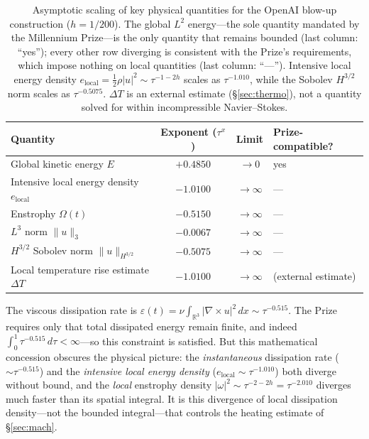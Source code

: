 \documentclass[11pt,a4paper]{article}
\begin{document}
\begin{table}[ht]
\centering
\begin{tabular}{lccl}
\toprule
\textbf{Quantity} & \textbf{Exponent} ($\tau^x$) & \textbf{Limit} & \textbf{Prize-compatible?} \\
\midrule
Global kinetic energy $E$                  & $+0.4850$   & $\to 0$        & yes \\
Intensive local energy density $e_{\text{local}}$ & $-1.0100$   & $\to \infty$   & --- \\
Enstrophy $\Omega(t)$                      & $-0.5150$   & $\to \infty$   & --- \\
$L^3$ norm $\|u\|_3$                        & $-0.0067$   & $\to \infty$   & --- \\
$H^{3/2}$ Sobolev norm $\|u\|_{H^{3/2}}$    & $-0.5075$   & $\to \infty$   & --- \\
Local temperature rise estimate $\Delta T$ & $-1.0100$   & $\to \infty$   & (external estimate) \\
\bottomrule
\end{tabular}
\caption{Asymptotic scaling of key physical quantities for the OpenAI blow-up construction
($h = 1/200$). The global $L^2$ energy---the sole quantity mandated by the Millennium Prize---is
the only quantity that remains bounded (last column: ``yes''); every other row diverging is
consistent with the Prize's requirements, which impose nothing on local quantities (last column:
``---''). Intensive local energy density $e_{\text{local}} = \frac{1}{2}\rho|u|^2 \sim \tau^{-1-2h}$ scales as $\tau^{-1.010}$, while the Sobolev $H^{3/2}$ norm scales as $\tau^{-0.5075}$. $\Delta T$ is an external estimate (\S\ref{sec:thermo}), not a quantity solved for within incompressible Navier--Stokes.}
\label{tab:thermo}
\end{table}

The viscous dissipation rate is $\varepsilon(t) = \nu \int_{\mathbb{R}^3} |\nabla \times u|^2\,dx
\sim \tau^{-0.515}$. The Prize requires only that total dissipated energy remain finite, and
indeed $\int_0^1 \tau^{-0.515}\,d\tau < \infty$---so this constraint is satisfied. But this
mathematical concession obscures the physical picture: the \emph{instantaneous} dissipation
rate ($\sim\tau^{-0.515}$) and the \emph{intensive local energy density} ($e_{\text{local}} \sim\tau^{-1.010}$) both
diverge without bound, and the \emph{local} enstrophy density $|\omega|^2\sim\tau^{-2-2h}=\tau^{-2.010}$
diverges much faster than its spatial integral. It is this divergence of local dissipation
density---not the bounded integral---that controls the heating estimate of \S\ref{sec:mach}.
\end{document}
